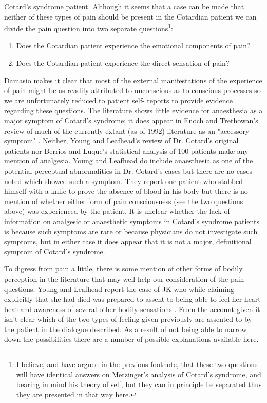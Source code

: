 Cotard's syndrome patient. Although it seems that a case can be made that neither of these types of pain should be present in the Cotardian patient we can divide the pain question into two separate questions\footnote{I believe, and have argued in the previous footnote, that these two questions will have identical answers on Metzinger's analysis of Cotard's syndrome, and bearing in mind his theory of self, but they can in principle be separated thus they are presented in that way here.}:

\begin{enumerate}
    \item Does the Cotardian patient experience the emotional components of pain?
    \item Does the Cotardian patient experience the direct sensation of pain?
\end{enumerate}

Damasio makes it clear that most of the external manifestations of the experience of pain might be as readily attributed to unconscious as to conscious processes so we are unfortunately reduced to patient self- reports to provide evidence regarding these questions. The literature shows little evidence for anaesthesia as a major symptom of Cotard's syndrome; it does appear in Enoch and Trethowan's review of much of the currently extant (as of 1992) literature as an "accessory symptom" \cite[p. 174]{enoch1991}. Neither, Young and Leafhead's review of Dr. Cotard's original patients nor Berrios and Luque's statistical analysis of 100 patients make any mention of analgesia. Young and Leafhead do include anaesthesia as one of the potential perceptual abnormalities in Dr. Cotard's cases but there are no cases noted which showed such a symptom. They report one patient who stabbed himself with a knife to prove the absence of blood in his body but there is no mention of whether either form of pain consciousness (see the two questions above) was experienced by the patient. It is unclear whether the lack of information on analgesic or anaesthetic symptoms in Cotard's syndrome patients is because such symptoms are rare or because physicians do not investigate such symptoms, but in either case it does appear that it is not a major, definitional symptom of Cotard's syndrome.

To digress from pain a little, there is some mention of other forms of bodily perception in the literature that may well help our consideration of the pain questions. Young and Leafhead report the case of JK who while claiming explicitly that she had died was prepared to assent to being able to feel her heart beat and awareness of several other bodily sensations \cite[p. 158]{young1995}. From the account given it isn't clear which of the two types of feeling given previously are assented to by the patient in the dialogue described. As a result of not being able to narrow down the possibilities there are a number of possible explanations available here.

